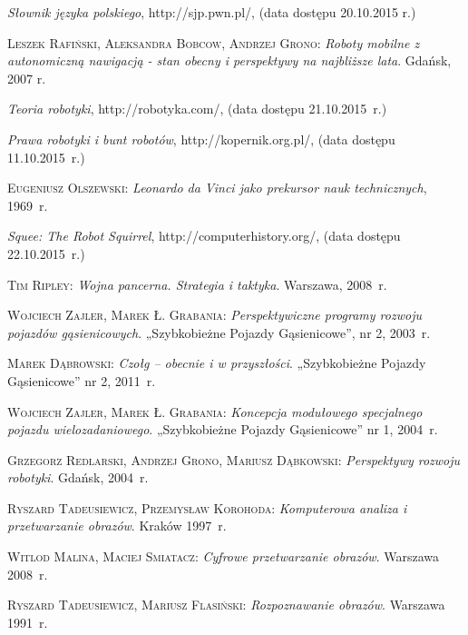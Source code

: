\begin{thebibliography}{9}
\emph{Słownik języka polskiego}, http://sjp.pwn.pl/, (data dostępu 20.10.2015 r.)

\textsc{Leszek Rafiński, Aleksandra Bobcow, Andrzej Grono}: \emph{Roboty mobilne z autonomiczną nawigacją - stan obecny i perspektywy na najbliższe lata}. Gdańsk, 2007 r.  

\emph{Teoria robotyki}, http://robotyka.com/, (data dostępu 21.10.2015~r.)

\emph{Prawa robotyki i bunt robotów}, http://kopernik.org.pl/, (data dostępu 11.10.2015~r.)

\textsc{Eugeniusz Olszewski}: \emph{Leonardo da Vinci jako prekursor nauk technicznych}, 1969~r.

\emph{Squee: The Robot Squirrel}, http://computerhistory.org/, (data dostępu 22.10.2015~r.)

\textsc{Tim Ripley}: \emph{Wojna pancerna. Strategia i taktyka}. Warszawa, 2008~r.

\textsc{Wojciech Zajler, Marek Ł. Grabania}: \emph{Perspektywiczne programy rozwoju pojazdów gąsienicowych}. „Szybkobieżne Pojazdy Gąsienicowe”, nr 2, 2003~r.

\textsc{Marek Dąbrowski}: \emph{Czołg – obecnie i w przyszłości}. „Szybkobieżne Pojazdy Gąsienicowe” nr 2, 2011~r.

\textsc{Wojciech Zajler, Marek Ł. Grabania}: \emph{Koncepcja modułowego specjalnego pojazdu wielozadaniowego}. „Szybkobieżne Pojazdy Gąsienicowe” nr 1, 2004~r.

\textsc{Grzegorz Redlarski, Andrzej Grono, Mariusz Dąbkowski}: \emph{Perspektywy rozwoju robotyki}. Gdańsk, 2004~r.

\textsc{Ryszard Tadeusiewicz, Przemysław Korohoda}: \emph{Komputerowa analiza i przetwarzanie obrazów}. Kraków 1997~r.

\textsc{Witlod Malina, Maciej Smiatacz}: \emph{Cyfrowe przetwarzanie obrazów}. Warszawa 2008~r.

\textsc{Ryszard Tadeusiewicz, Mariusz Flasiński}: \emph{Rozpoznawanie obrazów}. Warszawa 1991~r.


\end{thebibliography}
